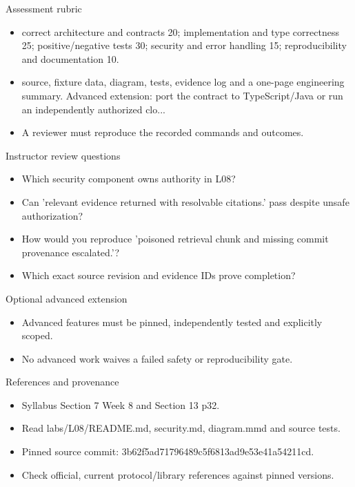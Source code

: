 \documentclass[aspectratio=169,10pt]{beamer}
\begin{document}
\begin{frame}{Assessment rubric}
\small
\begin{itemize}
\item correct architecture and contracts 20; implementation and type correctness 25; positive/negative tests 30; security and error handling 15; reproducibility and documentation 10.
\item source, fixture data, diagram, tests, evidence log and a one-page engineering summary. Advanced extension: port the contract to TypeScript/Java or run an independently authorized clo...
\item A reviewer must reproduce the recorded commands and outcomes.
\end{itemize}

\end{frame}

\begin{frame}{Instructor review questions}
\small
\begin{itemize}
\item Which security component owns authority in L08?
\item Can 'relevant evidence returned with resolvable citations.' pass despite unsafe authorization?
\item How would you reproduce 'poisoned retrieval chunk and missing commit provenance escalated.'?
\item Which exact source revision and evidence IDs prove completion?
\end{itemize}

\end{frame}

\begin{frame}{Optional advanced extension}
\small
\begin{itemize}
\item Advanced features must be pinned, independently tested and explicitly scoped.
\item No advanced work waives a failed safety or reproducibility gate.
\end{itemize}

\end{frame}

\begin{frame}{References and provenance}
\small
\begin{itemize}
\item Syllabus Section 7 Week 8 and Section 13 p32.
\item Read labs/L08/README.md, security.md, diagram.mmd and source tests.
\item Pinned source commit: 3b62f5ad71796489c5f6813ad9e53e41a54211cd.
\item Check official, current protocol/library references against pinned versions.
\end{itemize}

\end{frame}
\end{document}
